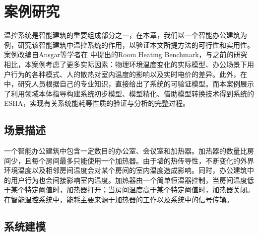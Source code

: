 \chapter{案例研究}
\label{ch5}
	温控系统是智能建筑的重要组成部分之一，在本章，我们以一个智能办公建筑为例，研究该智能建筑中温控系统的作用，以验证本文所提方法的可行性和实用性。案例改编自Ansgar等学者在\citep{DBLP:conf/hybrid/FehnkerI04} 中提出的Room Heating Benchmark，与之前的研究\citep{DBLP:journals/chinaf/DavidDLMS12,不确定环境下智能大厦空调系统调度策略评估,DBLP:conf/compsac/ChenGCDLS15}相比，本案例考虑了更多实际因素：物理环境温度变化的实际模型、办公场景下用户行为的各种模式、人的散热对室内温度的影响以及实时电价的差异。此外，在\citep{DBLP:journals/chinaf/DavidDLMS12,不确定环境下智能大厦空调系统调度策略评估,DBLP:conf/compsac/ChenGCDLS15}中，研究人员根据自己的专业知识，直接给出了系统的可验证模型。而本案例展示了利用领域本体指导构建系统初步模型、模型精化、借助模型转换技术得到系统的ESHA，实现有关系统能耗等性质的验证与分析的完整过程。
	
\section{场景描述}
	一个智能办公建筑中包含一定数目的办公室、会议室和加热器。加热器的数量比房间少，且每个房间最多只能使用一个加热器。由于墙的热传导性，不断变化的外界环境温度以及相邻房间温度会对某个房间的室内温度造成影响。同时，办公建筑中的用户行为也会间接影响室内温度。加热器由一个简单恒温器控制，当房间温度低于某个特定阈值时，加热器打开；当房间温度高于某个特定阈值时，加热器关闭。在智能温控系统中，能耗主要来源于加热器的工作以及系统中的信号传输。
	
\section{系统建模}
